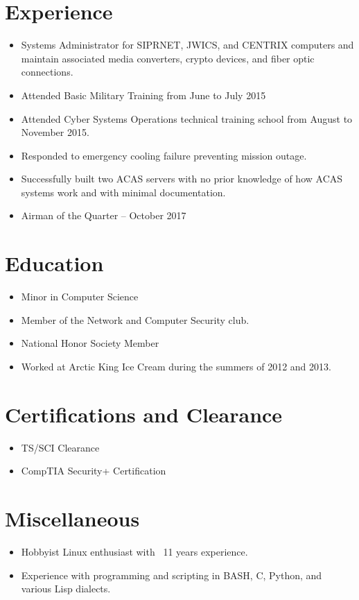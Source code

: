 \documentclass[12pt]{resume}
\author{Seth Sevier}
\begin{document}
\maketitle

\section{Experience}
\begin{itemize}
\item Systems Administrator for SIPRNET, JWICS, and CENTRIX computers and maintain associated media converters, crypto devices, and fiber optic connections.
\item Attended Basic Military Training from June to July 2015
\item Attended Cyber Systems Operations technical training school from August to November 2015.
\item Responded to emergency cooling failure preventing mission outage.
\item Successfully built two ACAS servers with no prior knowledge of how ACAS systems work and with minimal documentation.
\item Airman of the Quarter -- October 2017
\end{itemize}

\section{Education}
\begin{itemize}
\item Minor in Computer Science
\item Member of the Network and Computer Security club.
\end{itemize}
\begin{itemize}
\item National Honor Society Member
\item Worked at Arctic King Ice Cream during the summers of 2012 and 2013.
\end{itemize}

\section{Certifications and Clearance}
\begin{itemize}
\item TS/SCI Clearance
\item CompTIA Security+ Certification
\end{itemize}

\section{Miscellaneous}
\begin{itemize}
\item Hobbyist Linux enthusiast with ~11 years experience.
\item Experience with programming and scripting in BASH, C, Python, and various Lisp dialects.
\end{itemize}

\bigskip
{}
\end{document}
